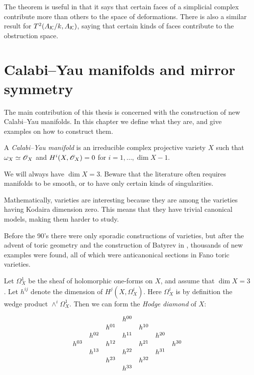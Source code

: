 The theorem is useful in that it says that certain faces of a simplicial complex contribute more than others to the space of deformations. There is also a similar result for $T^2(A_{\mathcal{K}}/k,A_{\mathcal{K}})$, saying that certain kinds of faces contribute to the obstruction space.

\section{Calabi--Yau manifolds and mirror symmetry}
\label{sec:calabi_yau}

The main contribution of this thesis is concerned with the construction of new Calabi--Yau manifolds. In this chapter we define what they are, and give examples on how to construct them.

\begin{definition}
A \emph{Calabi--Yau manifold} is an irreducible complex projective variety $X$ such that $\omega_X \simeq \mathscr{O}_X$ and $H^i(X,\mathscr{O}_X)=0$ for $i=1,\ldots,\dim X-1$.
\end{definition}

We will always have $\dim X=3$. Beware that the literature often requires \CY manifolds to be smooth, or to have only certain kinds of singularities.

Mathematically, \CY varieties are interesting because they are among the varieties having Kodaira dimension zero. This means that they have trivial canonical models, making them harder to study.

Before the 90's there were only sporadic constructions of \CY varieties, but after the advent of toric geometry and the construction of Batyrev in \cite{batyrev_mirrorsymmetry}, thousands of new examples were found, all of which were anticanonical sections in Fano toric varieties. 

Let $\Omega_X^1$ be the sheaf of holomorphic one-forms on $X$, and assume that $\dim X =3$. Let $h^{ij}$ denote the dimension of $H^j(X,\Omega_X^i)$. Here $\Omega_X^i$ is by definition the wedge product $\wedge^i \Omega_X^1$.  Then we can form the \emph{Hodge diamond} of $X$:

\[
\begin{array}[c]{ccccccc}
&&&               h^{00} \\  
 &         & h^{01} & & h^{10}  \\
&	h^{02} && h^{11}  && h^{20}  \\
   h^{03} && h^{12} && h^{21} && h^{30} \\
&	h^{13} && h^{22}  && h^{31}  \\
 &         & h^{23} & & h^{32}  \\
                &&& h^{33} 
\end{array}
\]

